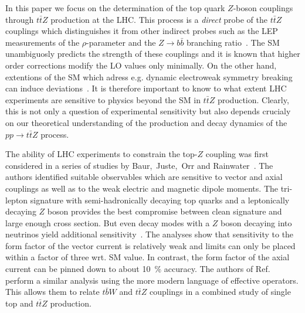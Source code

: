 \documentclass[preprint]{JHEP3} %
\def\ttbZ{t\bar{t}Z}
\begin{document}
In this paper we focus on the determination of the top quark $Z$-boson couplings through $\ttbZ$ production at the LHC. 
This process is a {\it direct} probe of the $\ttbZ$ couplings which distinguishes it from other indirect probes such as 
the LEP measurements of the $\rho$-parameter and the $Z \to b \bar{b}$ branching ratio~\cite{}. 
The SM unambiguosly predicts the strength of these couplings and it is known that higher order corrections modify the LO values only minimally.
On the other hand, extentions of the SM which adress e.g. dynamic electroweak symmetry breaking can induce deviations~\cite{}. 
% 
% 
It is therefore important to know to what extent LHC experiments are sensitive to physics beyond the SM in $\ttbZ$ production.
Clearly, this is not only a question of experimental sensitivity but also depends crucialy on our theoretical understanding of the production and decay dynamics 
of the $pp\to\ttbZ$ process.

The ability of LHC experiments to constrain the top-$Z$ coupling was first considered in a series of studies by Baur,~Juste,~Orr and Rainwater~\cite{Baur:2004uw,Baur:2005wi,one more Baur paper}. 
The authors identified suitable observables which are sensitive to vector and axial couplings as well as to the weak electric and magnetic dipole moments.
The tri-lepton signature with semi-hadronically decaying top quarks and a leptonically decaying $Z$ boson provides the best compromise between
clean signature and large enough cross section. 
But even decay modes with a $Z$ boson decaying into neutrinos yield additional sensitivity~\cite{Baur:2005wi}.
The analyses show that sensitivity to the form factor of the vector current is relatively weak and limits can only be placed within a factor of three wrt. SM value. 
In contrast, the form factor of the axial current can be pinned down to about 10~\% accuracy. 
The authors of Ref.~\cite{Berger:2009hi} perform a similar analysis using the more modern language of effective operators.
This allows them to relate $t\bar{b}W$ and $\ttbZ$ couplings in a combined study of single top and $\ttbZ$ production.
\end{document}
